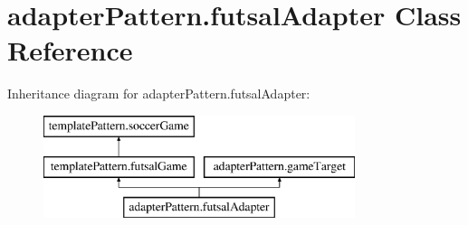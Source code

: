 \hypertarget{classadapter_pattern_1_1futsal_adapter}{}\section{adapter\+Pattern.\+futsal\+Adapter Class Reference}
\label{classadapter_pattern_1_1futsal_adapter}
Inheritance diagram for adapter\+Pattern.\+futsal\+Adapter\+:\begin{figure}[H]
\begin{center}
\leavevmode
\includegraphics[height=3.000000cm]{classadapter_pattern_1_1futsal_adapter}
\end{center}
\end{figure}
